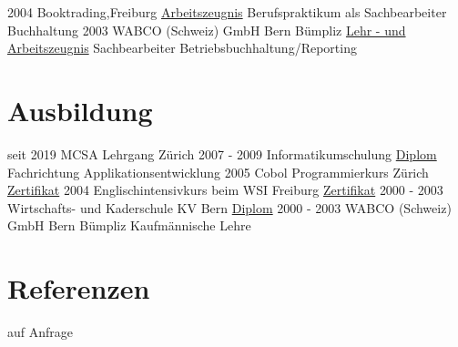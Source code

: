 \documentclass[a4paper]{twentysecondcv} %
\begin{document}
\begin{twenty}
	\twentyitem
    	{2004}
	{}
        {Booktrading,\textnormal{Freiburg}}
        {\hyperlink{booktrading}{\textcolor{pblue}{Arbeitszeugnis}}}
        {Berufspraktikum als Sachbearbeiter Buchhaltung}
	{}
	\twentyitem
    	{2003}
	{}
        {WABCO (Schweiz) GmbH \textnormal{Bern Bümpliz}}
        {\hyperlink{wabco}{\textcolor{pblue}{Lehr - und Arbeitszeugnis}}}
        {Sachbearbeiter Betriebsbuchhaltung/Reporting}
	{}	
\end{twenty}
\hypertarget{cert_back}{}
\section{Ausbildung}
\begin{twenty} %
	\twentyitem
    	{seit 2019}
        {}
        {MCSA Lehrgang \textnormal{Zürich}}
        {}
        {}
        {}	
	\twentyitem
    	{2007 - 2009}
	{}
        {Informatikumschulung}
        {\hyperlink{informatik}{\textcolor{pblue}{Diplom}}}
        {Fachrichtung Applikationsentwicklung}
        {}
	\twentyitem
    	{2005}
	{}
        {Cobol Programmierkurs \textnormal{Zürich}}
        {\hyperlink{cobol}{\textcolor{pblue}{Zertifikat}}}
        {}
        {}
	\twentyitem
    	{2004}
	{}
        {Englischintensivkurs beim WSI \textnormal{Freiburg}}
        {\hyperlink{toeic}{\textcolor{pblue}{Zertifikat}}}
        {}
        {}
	\twentyitem
    	{2000 - 2003}
        {}
        {Wirtschafts- und Kaderschule \textnormal{KV Bern}}
        {\hyperlink{kv}{\textcolor{pblue}{Diplom}}}
        {}
        {}
\twentyitem
    	{2000 - 2003}
	{}
        {WABCO (Schweiz) GmbH \textnormal{Bern Bümpliz}}
        {}
        {Kaufmännische Lehre}
	{}	%
\end{twenty}

\section{Referenzen}

\begin{twenty} %
\twentyitem
    	{auf Anfrage}
	{}
        {}
        {}
        {}
        {}
\end{twenty}
\newpage
\hypertarget{link2}{}

\end{document}
